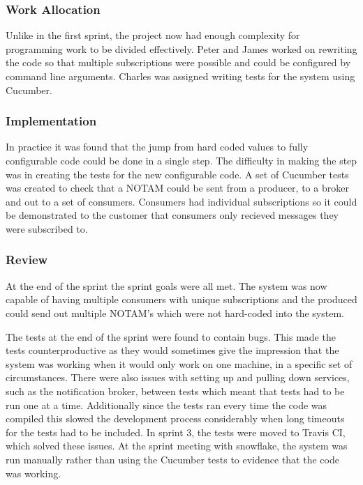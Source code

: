 \documentclass[a4paper, 12pt, twoside]{article}
\begin{document}
\subsubsection{Work Allocation}

Unlike in the first sprint, the project now had enough complexity for programming work to be divided effectively. Peter and James worked on rewriting the code so that multiple subscriptions were possible and could be configured by command line arguments. Charles was assigned writing tests for the system using Cucumber.

\subsubsection{Implementation}

In practice it was found that the jump from hard coded values to fully configurable code could be done in a single step. The difficulty in making the step was in creating the tests for the new configurable code. A set of Cucumber tests was created to check that a NOTAM could be sent from a producer, to a broker and out to a set of consumers. Consumers had individual subscriptions so it could be demonstrated to the customer that consumers only recieved messages they were subscribed to.

\subsubsection{Review}

At the end of the sprint the sprint goals were all met. The system was now capable of having multiple consumers with unique subscriptions and the produced could send out multiple NOTAM's which were not hard-coded into the system. 

The tests at the end of the sprint were found to contain bugs. This made the tests counterproductive as they would sometimes give the impression that the system was working when it would only work on one machine, in a specific set of circumstances. There were also issues with setting up and pulling down services, such as the notification broker, between tests which meant that tests had to be run one at a time. Additionally since the tests ran every time the code was compiled this slowed the development process considerably when long timeouts for the tests had to be included. In sprint 3, the tests were moved to Travis CI, which solved these issues. At the sprint meeting with snowflake, the system was run manually rather than using the Cucumber tests to evidence that the code was working.
\end{document}
